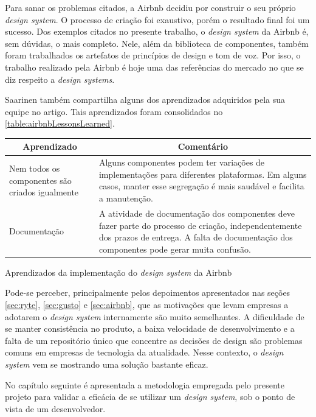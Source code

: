 Para sanar os problemas citados, a Airbnb decidiu por construir o seu próprio \textit{design system}. O processo de criação foi exaustivo, porém o resultado final foi um sucesso. Dos exemplos citados no presente trabalho, o \textit{design system} da Airbnb é, sem dúvidas, o mais completo. Nele, além da biblioteca de componentes, também foram trabalhados os artefatos de princípios de design e tom de voz. Por isso, o trabalho realizado pela Airbnb é hoje uma das referências do mercado no que se diz respeito a \textit{design systems}.

Saarinen também compartilha alguns dos aprendizados adquiridos pela sua equipe no artigo. Tais aprendizados foram consolidados no \autoref{table:airbnbLessonsLearned}.

\begin{quadro}
\centering
\begin{tabular}{|m{4cm}|m{10cm}|} \hline
	
	\multicolumn{1}{|c|}{\bfseries Aprendizado} & \multicolumn{1}{c|}{\bfseries Comentário} \\\hline
	
	 Nem todos os componentes são criados igualmente & Alguns componentes podem ter variações de implementações para diferentes plataformas. Em alguns casos, manter esse segregação é mais saudável e facilita a manutenção. \\\hline
	 
	 Documentação & A atividade de documentação dos componentes deve fazer parte do processo de criação, independentemente dos prazos de entrega. A falta de documentação dos componentes pode gerar muita confusão. \\\hline
    
\end{tabular}
\caption{Aprendizados da implementação do \textit{design system} da Airbnb}
\label{table:airbnbLessonsLearned}
\end{quadro}

Pode-se perceber, principalmente pelos depoimentos apresentados nas seções \ref{sec:ryte}, \ref{sec:gusto} e \ref{sec:airbnb}, que as motivações que levam empresas a adotarem o \textit{design system} internamente são muito semelhantes. A dificuldade de se manter consistência no produto, a baixa velocidade de desenvolvimento e a falta de um repositório único que concentre as decisões de design são problemas comuns em empresas de tecnologia da atualidade. Nesse contexto, o \textit{design system} vem se mostrando uma solução bastante eficaz.

No capítulo seguinte é apresentada a metodologia empregada pelo presente projeto para validar a eficácia de se utilizar um \textit{design system}, sob o ponto de vista de um desenvolvedor.
